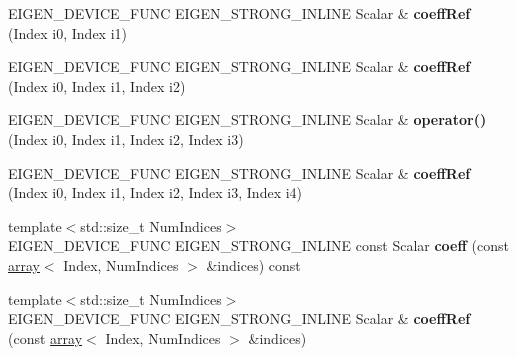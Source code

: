 \begin{DoxyCompactItemize}
\item 
\mbox{\label{class_eigen_1_1_tensor_ref_ac2a1483a4965b0021484d4df8811af5a}} 
E\+I\+G\+E\+N\+\_\+\+D\+E\+V\+I\+C\+E\+\_\+\+F\+U\+NC E\+I\+G\+E\+N\+\_\+\+S\+T\+R\+O\+N\+G\+\_\+\+I\+N\+L\+I\+NE Scalar \& {\bfseries coeff\+Ref} (Index i0, Index i1)
\item 
\mbox{\label{class_eigen_1_1_tensor_ref_abe81fca60dc0a1db6fc05ad1486185ed}} 
E\+I\+G\+E\+N\+\_\+\+D\+E\+V\+I\+C\+E\+\_\+\+F\+U\+NC E\+I\+G\+E\+N\+\_\+\+S\+T\+R\+O\+N\+G\+\_\+\+I\+N\+L\+I\+NE Scalar \& {\bfseries coeff\+Ref} (Index i0, Index i1, Index i2)
\item 
\mbox{\label{class_eigen_1_1_tensor_ref_ab596bb0753922df7f4753277388d361e}} 
E\+I\+G\+E\+N\+\_\+\+D\+E\+V\+I\+C\+E\+\_\+\+F\+U\+NC E\+I\+G\+E\+N\+\_\+\+S\+T\+R\+O\+N\+G\+\_\+\+I\+N\+L\+I\+NE Scalar \& {\bfseries operator()} (Index i0, Index i1, Index i2, Index i3)
\item 
\mbox{\label{class_eigen_1_1_tensor_ref_a06c558b2cfb6a9d4795a71d9d4ef6968}} 
E\+I\+G\+E\+N\+\_\+\+D\+E\+V\+I\+C\+E\+\_\+\+F\+U\+NC E\+I\+G\+E\+N\+\_\+\+S\+T\+R\+O\+N\+G\+\_\+\+I\+N\+L\+I\+NE Scalar \& {\bfseries coeff\+Ref} (Index i0, Index i1, Index i2, Index i3, Index i4)
\item 
\mbox{\label{class_eigen_1_1_tensor_ref_a42cc669aea64fb4d84b689abd9686524}} 
{\footnotesize template$<$std\+::size\+\_\+t Num\+Indices$>$ }\\E\+I\+G\+E\+N\+\_\+\+D\+E\+V\+I\+C\+E\+\_\+\+F\+U\+NC E\+I\+G\+E\+N\+\_\+\+S\+T\+R\+O\+N\+G\+\_\+\+I\+N\+L\+I\+NE const Scalar {\bfseries coeff} (const \hyperlink{class_eigen_1_1array}{array}$<$ Index, Num\+Indices $>$ \&indices) const
\item 
\mbox{\label{class_eigen_1_1_tensor_ref_a57a515b812336de074aaf6ad7b94b08b}} 
{\footnotesize template$<$std\+::size\+\_\+t Num\+Indices$>$ }\\E\+I\+G\+E\+N\+\_\+\+D\+E\+V\+I\+C\+E\+\_\+\+F\+U\+NC E\+I\+G\+E\+N\+\_\+\+S\+T\+R\+O\+N\+G\+\_\+\+I\+N\+L\+I\+NE Scalar \& {\bfseries coeff\+Ref} (const \hyperlink{class_eigen_1_1array}{array}$<$ Index, Num\+Indices $>$ \&indices)
\item 

\end{DoxyCompactItemize}
